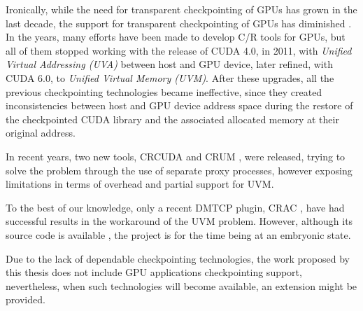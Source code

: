 Ironically, while the need for transparent checkpointing of GPUs has grown in the last decade, the support for transparent checkpointing of GPUs has diminished \cite{10.5555/3433701.3433803}. In the years, many efforts have been made to develop C/R tools for GPUs, but all of them stopped working with the release of CUDA 4.0, in 2011, with \emph{Unified Virtual Addressing (UVA)} between host and GPU device, later refined, with CUDA 6.0, to \emph{Unified Virtual Memory (UVM)}. After these upgrades, all the previous checkpointing technologies became ineffective, since they created inconsistencies between host and GPU device address space during the restore of the checkpointed CUDA library and the associated allocated memory at their original address.

In recent years, two new tools, CRCUDA \cite{suzuki2016transparent} and CRUM \cite{8514890}, were released, trying to solve the problem through the use of separate proxy processes, however exposing limitations in terms of overhead and partial support for UVM. 

To the best of our knowledge, only a recent DMTCP plugin, CRAC \cite{10.5555/3433701.3433803}, have had successful results in the workaround of the UVM problem. However, although its source code is available \cite{dmtcp-crac}, the project is for the time being at an embryonic state. 

Due to the lack of dependable checkpointing technologies, the work proposed by this thesis does not include GPU applications checkpointing support, nevertheless, when such technologies will become available, an extension might be provided.

